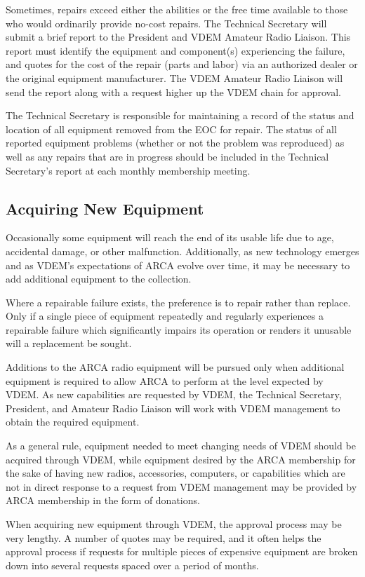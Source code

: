 \documentclass[pdflatex,letterpaper,twoside,12pt]{book}
\begin{document}
Sometimes, repairs exceed either the abilities or the free time available to those who would ordinarily provide no-cost repairs.  The Technical Secretary will submit a brief report to the President and VDEM Amateur Radio Liaison.  This report must identify the equipment and component(s) experiencing the failure, and quotes for the cost of the repair (parts and labor) via an authorized dealer or the original equipment manufacturer.  The VDEM Amateur Radio Liaison will send the report along with a request higher up the VDEM chain for approval.

The Technical Secretary is responsible for maintaining a record of the status and location of all equipment removed from the EOC for repair.  The status of all reported equipment problems (whether or not the problem was reproduced) as well as any repairs that are in progress should be included in the Technical Secretary's report at each monthly membership meeting.

\subsection{Acquiring New Equipment}

Occasionally some equipment will reach the end of its usable life due to age, accidental damage, or other malfunction.  Additionally, as new technology emerges and as VDEM's expectations of ARCA evolve over time, it may be necessary to add additional equipment to the collection.

Where a repairable failure exists, the preference is to repair rather than replace.  Only if a single piece of equipment repeatedly and regularly experiences a repairable failure which significantly impairs its operation or renders it unusable will a replacement be sought.

Additions to the ARCA radio equipment will be pursued only when additional equipment is required to allow ARCA to perform at the level expected by VDEM.  As new capabilities are requested by VDEM, the Technical Secretary, President, and Amateur Radio Liaison will work with VDEM management to obtain the required equipment.

As a general rule, equipment needed to meet changing needs of VDEM should be acquired through VDEM, while equipment desired by the ARCA membership for the sake of having new radios, accessories, computers, or capabilities which are not in direct response to a request from VDEM management may be provided by ARCA membership in the form of donations.

When acquiring new equipment through VDEM, the approval process may be very lengthy.  A number of quotes may be required, and it often helps the approval process if requests for multiple pieces of expensive equipment are broken down into several requests spaced over a period of months.

\end{document}
